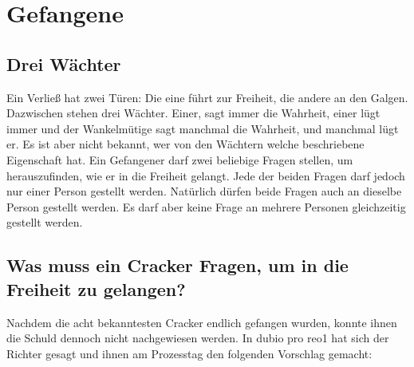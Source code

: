 


\renewcommand{\author}{Philipp G. Freimann}
\renewcommand{\grafikautor}{Ph. G. Freimann}
\renewcommand{\authoremail}{philipp.freimann@bbw.ch}
\renewcommand{\erstellungsdatum}{10. Nov. 2021}
\renewcommand{\docversion}{2.36 \TeX}
\renewcommand{\doctitel}{Denksportaufgaben}

\renewcommand{\fachthema}{Mathematischer Denkanstoß---}
\renewcommand{\ausrichtungAufTitelseite}{}



\ptitlepage
\newpage

\section{Gefangene}
\subsection{Drei Wächter}
Ein Verließ hat zwei Türen: Die eine führt zur Freiheit, die andere an den
Galgen. Dazwischen stehen drei Wächter. Einer, sagt immer die Wahrheit, einer
lügt immer und der Wankelmütige sagt manchmal die Wahrheit, und manchmal
lügt er. Es ist aber nicht bekannt, wer von den Wächtern welche beschriebene
Eigenschaft hat.
Ein Gefangener darf zwei beliebige Fragen stellen, um herauszufinden, wie er in
die Freiheit gelangt. Jede der beiden Fragen darf jedoch nur einer Person
gestellt werden. Natürlich dürfen beide Fragen auch an dieselbe Person gestellt
werden. Es darf aber keine Frage an mehrere Personen gleichzeitig gestellt
werden.
\TNTeop{}


\subsection{Was muss ein Cracker Fragen, um in die Freiheit zu gelangen?}

Nachdem die acht bekanntesten Cracker endlich gefangen wurden, konnte
ihnen die Schuld dennoch nicht nachgewiesen werden. In dubio pro reo1 hat
sich der Richter gesagt und ihnen am Prozesstag den folgenden Vorschlag
gemacht:

